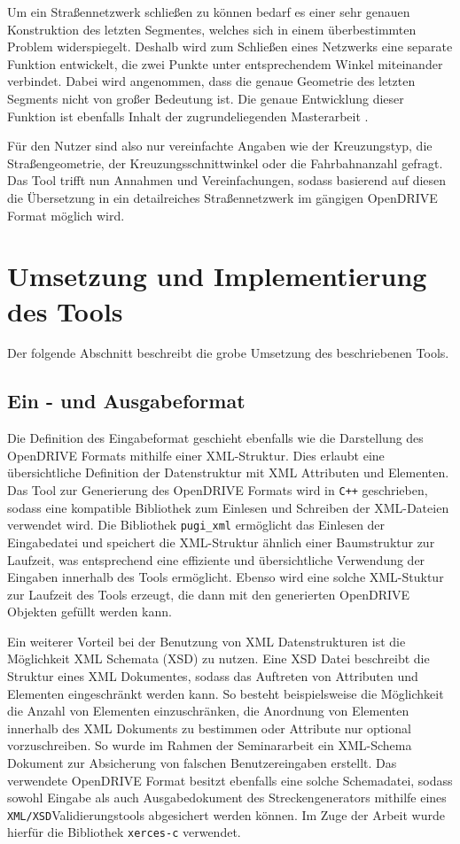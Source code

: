 Um ein Straßennetzwerk schließen zu können bedarf es einer sehr genauen Konstruktion des letzten Segmentes, welches sich in einem überbestimmten Problem widerspiegelt. Deshalb wird zum Schließen eines Netzwerks eine separate Funktion entwickelt, die zwei Punkte unter entsprechendem Winkel miteinander verbindet. Dabei wird angenommen, dass die genaue Geometrie des letzten Segments nicht von großer Bedeutung ist. Die genaue Entwicklung dieser Funktion ist ebenfalls Inhalt der zugrundeliegenden Masterarbeit \cite{Russ.2019}.

Für den Nutzer sind also nur vereinfachte Angaben wie der Kreuzungstyp, die Straßengeometrie, der Kreuzungsschnittwinkel oder die Fahrbahnanzahl gefragt. Das Tool trifft nun Annahmen und Vereinfachungen, sodass basierend auf diesen die Übersetzung in ein detailreiches Straßennetzwerk im gängigen OpenDRIVE Format möglich wird.

\chapter{Umsetzung und Implementierung des Tools}
Der folgende Abschnitt beschreibt die grobe Umsetzung des beschriebenen Tools. 

\section{Ein - und Ausgabeformat}
Die Definition des Eingabeformat geschieht ebenfalls wie die Darstellung des OpenDRIVE Formats mithilfe einer XML-Struktur. Dies erlaubt eine übersichtliche Definition der Datenstruktur mit XML Attributen und Elementen. Das Tool zur Generierung des OpenDRIVE Formats wird in \texttt{C++} geschrieben, sodass eine kompatible Bibliothek zum Einlesen und Schreiben der XML-Dateien verwendet wird. Die Bibliothek \texttt{pugi\_xml}\cite{pugixml.2019} ermöglicht das Einlesen der Eingabedatei und speichert die XML-Struktur ähnlich einer Baumstruktur zur Laufzeit, was entsprechend eine effiziente und übersichtliche Verwendung der Eingaben innerhalb des Tools ermöglicht. Ebenso wird eine solche XML-Stuktur zur Laufzeit des Tools erzeugt, die dann mit den generierten OpenDRIVE Objekten gefüllt werden kann.

Ein weiterer Vorteil bei der Benutzung von XML Datenstrukturen ist die Möglichkeit XML Schemata (XSD) zu nutzen. Eine XSD Datei beschreibt die Struktur eines XML Dokumentes, sodass das Auftreten von Attributen und Elementen eingeschränkt werden kann. So besteht beispielsweise die Möglichkeit die Anzahl von Elementen einzuschränken, die Anordnung von Elementen innerhalb des XML Dokuments zu bestimmen oder Attribute nur optional vorzuschreiben. So wurde im Rahmen der Seminararbeit ein XML-Schema Dokument zur Absicherung von falschen Benutzereingaben erstellt. Das verwendete OpenDRIVE Format besitzt ebenfalls eine solche Schemadatei, sodass sowohl Eingabe als auch Ausgabedokument des Streckengenerators mithilfe eines \texttt{XML/XSD}Validierungstools abgesichert werden können. Im Zuge der Arbeit wurde hierfür die Bibliothek \texttt{xerces-c}\cite{Xerces.2019} verwendet.

